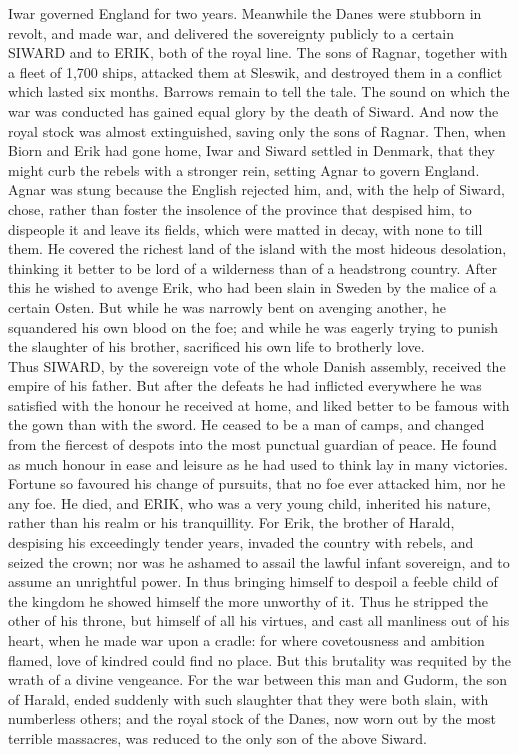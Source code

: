 \documentclass[10pt,a4paper]{report}
\begin{document}
Iwar governed England for two years. Meanwhile the Danes were stubborn in revolt, and made war, and delivered the sovereignty publicly to a certain SIWARD and to ERIK, both of the royal line. The sons of Ragnar, together with a fleet of 1,700 ships, attacked them at Sleswik, and destroyed them in a conflict which lasted six months. Barrows remain to tell the tale. The sound on which the war was conducted has gained equal glory by the death of Siward. And now the royal stock was almost extinguished, saving only the sons of Ragnar. Then, when Biorn and Erik had gone home, Iwar and Siward settled in Denmark, that they might curb the rebels with a stronger rein, setting Agnar to govern England. Agnar was stung because the English rejected him, and, with the help of Siward, chose, rather than foster the insolence of the province that despised him, to dispeople it and leave its fields, which were matted in decay, with none to till them. He covered the richest land of the island with the most hideous desolation, thinking it better to be lord of a wilderness than of a headstrong country. After this he wished to avenge Erik, who had been slain in Sweden by the malice of a certain Osten. But while he was narrowly bent on avenging another, he squandered his own blood on the foe; and while he was eagerly trying to punish the slaughter of his brother, sacrificed his own life to brotherly love.\\

Thus SIWARD, by the sovereign vote of the whole Danish assembly, received the empire of his father. But after the defeats he had inflicted everywhere he was satisfied with the honour he received at home, and liked better to be famous with the gown than with the sword. He ceased to be a man of camps, and changed from the fiercest of despots into the most punctual guardian of peace. He found as much honour in ease and leisure as he had used to think lay in many victories. Fortune so favoured his change of pursuits, that no foe ever attacked him, nor he any foe. He died, and ERIK, who was a very young child, inherited his nature, rather than his realm or his tranquillity. For Erik, the brother of Harald, despising his exceedingly tender years, invaded the country with rebels, and seized the crown; nor was he ashamed to assail the lawful infant sovereign, and to assume an unrightful power. In thus bringing himself to despoil a feeble child of the kingdom he showed himself the more unworthy of it. Thus he stripped the other of his throne, but himself of all his virtues, and cast all manliness out of his heart, when he made war upon a cradle: for where covetousness and ambition flamed, love of kindred could find no place. But this brutality was requited by the wrath of a divine vengeance. For the war between this man and Gudorm, the son of Harald, ended suddenly with such slaughter that they were both slain, with numberless others; and the royal stock of the Danes, now worn out by the most terrible massacres, was reduced to the only son of the above Siward.\\
\end{document}
